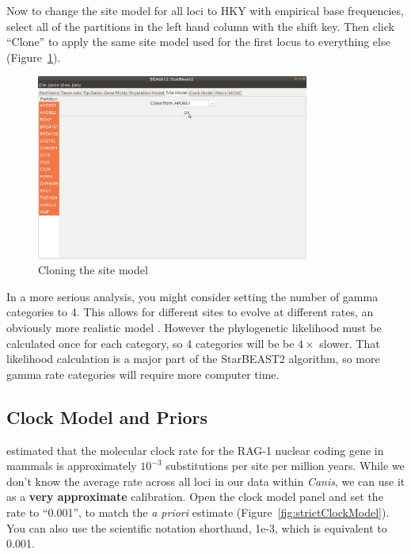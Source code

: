 \documentclass[12pt]{article}
\begin{document}
Now to change the site model for all loci to HKY with empirical base frequencies,
select all of the partitions in the left hand column with the shift key. Then
click ``Clone'' to apply the same site model used for the first locus
to everything else (Figure~\ref{fig:cloneSiteModel}).

\begin{figure}[htb!]
\centering
\includegraphics[width=0.8\textwidth]{figures/cloneSiteModel.png}
\caption
{Cloning the site model}
\label{fig:cloneSiteModel}
\end{figure}

In a more serious analysis, you might consider setting the number of gamma
categories to 4. This allows for different sites to evolve at
different rates, an obviously more realistic model \citep{Yang1994}. However
the phylogenetic likelihood must be calculated once for each category, so 4
categories will be be $4\times$ slower. That likelihood calculation is a major
part of the StarBEAST2 algorithm, so more gamma rate categories will require
more computer time.

\clearpage

\subsection{Clock Model and Priors}
\label{subsec:clockModelAndPriors}

\cite{Hugall2007} estimated that the molecular
clock rate for the RAG-1 nuclear coding gene in mammals is approximately
$10^{-3}$ substitutions per site per million years. While we don't know
the average rate across all loci in our data within \textit{Canis}, we can
use it as a \textbf{very approximate} calibration. Open the clock model panel
and set the rate to ``0.001'', to match the \textit{a priori} estimate
(Figure~\ref{fig:strictClockModel}). You can also use the scientific
notation shorthand, 1e-3, which is equivalent to 0.001.
\end{document}
